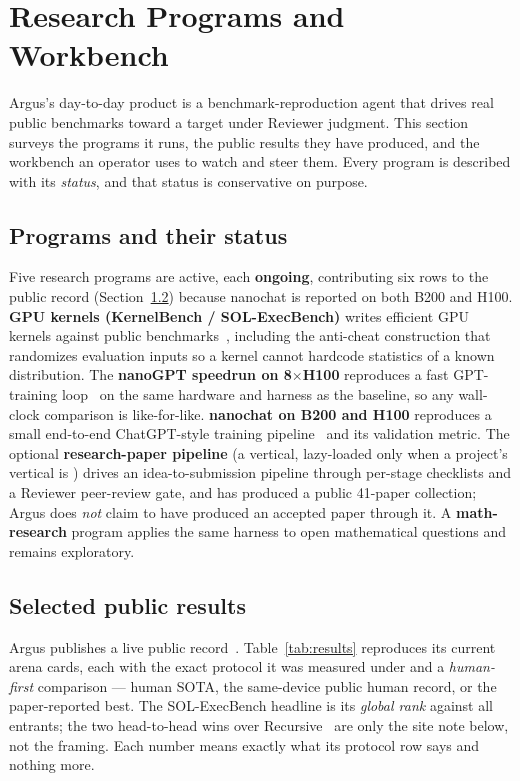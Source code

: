 \section{Research Programs and Workbench}
\label{sec:programs}

Argus's day-to-day product is a benchmark-reproduction agent that drives real
public benchmarks toward a target under Reviewer judgment. This section surveys
the programs it runs, the public results they have produced, and the workbench an
operator uses to watch and steer them. Every program is described with its
\emph{status}, and that status is conservative on purpose.

\subsection{Programs and their status}

Five research programs are active, each \textbf{ongoing}, contributing six rows to the
public record (Section~\ref{sec:results}) because nanochat is reported on both
B200 and H100. \textbf{GPU kernels (KernelBench /
SOL-ExecBench)} writes efficient GPU kernels against public
benchmarks~\cite{ouyang2025kernelbench}, including the anti-cheat construction
that randomizes evaluation inputs so a kernel cannot hardcode statistics of a
known distribution. The \textbf{nanoGPT speedrun on 8$\times$H100} reproduces a
fast GPT-training loop~\cite{karpathy_nanogpt} on the same hardware and harness as
the baseline, so any wall-clock comparison is like-for-like. \textbf{nanochat on
B200 and H100} reproduces a small end-to-end ChatGPT-style training
pipeline~\cite{karpathy_nanochat} and its validation metric. The optional
\textbf{research-paper pipeline} (a  vertical, lazy-loaded only when
a project's vertical is ) drives an idea-to-submission pipeline
through per-stage checklists and a Reviewer peer-review gate, and has produced a
public 41-paper collection; Argus does \emph{not} claim to have produced an
accepted paper through it. A \textbf{math-research} program applies the same
harness to open mathematical questions and remains exploratory.

\subsection{Selected public results}
\label{sec:results}

Argus publishes a live public record~\cite{argus_results}. Table~\ref{tab:results}
reproduces its current arena cards, each with the exact protocol it was measured
under and a \emph{human-first} comparison --- human SOTA, the same-device public
human record, or the paper-reported best. The SOL-ExecBench headline is its
\emph{global rank} against all entrants; the two head-to-head wins over
Recursive~\cite{recursive2026firststeps} are only the site note below, not the
framing. Each number means exactly what its protocol row says and nothing more.

